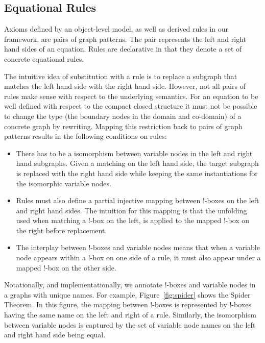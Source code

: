 \documentclass[runningheads]{llncs}
\begin{document}
\subsection{Equational Rules}

Axioms defined by an object-level model, as well as derived rules in
our framework, are pairs of graph patterns. The pair represents the
left and right hand sides of an equation. Rules are declarative in
that they denote a set of concrete equational rules. 

The intuitive idea of substitution with a rule is to replace a
subgraph that matches the left hand side with the right hand side.
However, not all pairs of rules make sense with respect to the
underlying semantics. For an equation to be well defined with respect
to the compact closed structure it must not be possible to change the
type (the boundary nodes in the domain and co-domain) of a concrete
graph by rewriting.  Mapping this restriction back to pairs of graph
patterns results in the following conditions on rules:

\begin{itemize}

\item There has to be a isomorphism between variable nodes in the left
  and right hand subgraphs. Given a matching on the left hand side,
  the target subgraph is replaced with the right hand side while
  keeping the same instantiations for the isomorphic variable nodes.

\item Rules must also define a partial injective mapping between
  !-boxes on the left and right hand sides. The intuition for this
  mapping is that the unfolding used when matching a !-box on the
  left, is applied to the mapped !-box on the right before
  replacement.

\item The interplay between !-boxes and variable nodes means that when
  a variable node appears within a !-box on one side of a rule, it must
  also appear under a mapped !-box on the other side.

\end{itemize}

Notationally, and implementationally, we annotate !-boxes and variable
nodes in a graphs with unique names. For example,
Figure~\ref{fig:spider} shows the Spider Theorem. In this
figure, the mapping between !-boxes is represented by !-boxes having
the same name on the left and right of a rule.  Similarly, the
isomorphism between variable nodes is captured by the set of variable
node names on the left and right hand side being equal.
\end{document}
